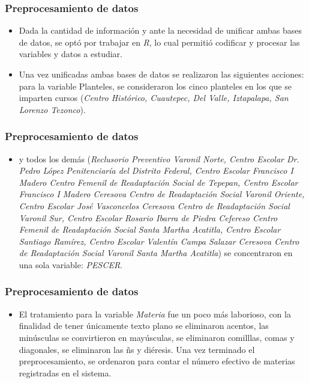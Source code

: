 \documentclass[xcolor=dvipsnames]{beamer}
\begin{document}
\begin{frame}\frametitle{Preprocesamiento de datos}
\begin{itemize}

\item Dada la cantidad de informaci\'on y ante la necesidad de unificar ambas bases de datos, se opt\'o por trabajar en \textit{R}, lo cual permiti\'o codificar y procesar las variables y datos a estudiar.


\item 
Una vez unificadas ambas bases de datos se realizaron las siguientes acciones:
para la variable Planteles, se consideraron los cinco planteles en los que se imparten cursos  (\textit{Centro Hist\'orico, Cuautepec, Del Valle, Iztapalapa, San Lorenzo Tezonco}).

\end{itemize}




\end{frame}


\begin{frame}\frametitle{Preprocesamiento de datos}
\begin{itemize}

\item  y todos los dem\'as (\textit{Reclusorio Preventivo Varonil Norte, Centro Escolar Dr. Pedro L\'opez Penitenciar\'ia del Distrito Federal, Centro Escolar Francisco I Madero Centro Femenil de Readaptaci\'on Social de Tepepan, Centro Escolar Francisco I Madero Ceresova Centro de Readaptaci\'on Social Varonil Oriente, Centro Escolar Jos\'e Vasconcelos Ceresova Centro de Readaptaci\'on Social Varonil Sur, Centro Escolar Rosario Ibarra de Piedra Cefereso Centro Femenil de Readaptaci\'on Social Santa Martha Acatitla, Centro Escolar Santiago Ram\'irez, Centro Escolar Valent\'in Campa Salazar Ceresova Centro de Readaptaci\'on Social Varonil Santa Martha Acatitla}) se concentraron en una sola variable: \textit{PESCER}.



\end{itemize}


\end{frame}


\begin{frame}\frametitle{Preprocesamiento de datos}
\begin{itemize}

\item El tratamiento para la variable \textit{Materia} fue un poco m\'as laborioso, con la finalidad de tener \'unicamente texto plano se eliminaron acentos, las min\'usculas se convirtieron en may\'usculas, se eliminaron comilllas, comas y diagonales, se eliminaron las \~ns y di\'eresis. Una vez terminado el preprocesamiento, se ordenaron para contar el n\'umero efectivo de materias registradas en el sistema.



\end{itemize}



\end{frame}
\end{document}
